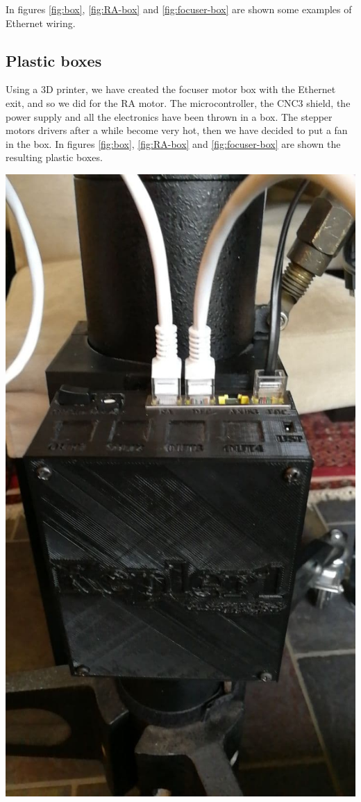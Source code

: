 \documentclass{article}
\begin{document}
\begin{multicols}{2}
        In figures \ref{fig:box}, \ref{fig:RA-box} and \ref{fig:focuser-box} are shown some examples of Ethernet wiring.

        \subsection{Plastic boxes}
        Using a 3D printer, we have created the focuser motor box with the Ethernet exit, and so we did for the RA motor.
        The microcontroller, the CNC3 shield, the power supply and all the electronics have been thrown in a box.
        The stepper motors drivers after a while become very hot, then we have decided to put a fan in the box.
        In figures \ref{fig:box}, \ref{fig:RA-box} and \ref{fig:focuser-box} are shown the resulting plastic boxes.

        \begin{minipage}
            {0.5\textwidth}
            \centering
            \includegraphics[scale=0.5]{BOX.jpg}

\end{minipage}
\end{multicols}
\end{document}
